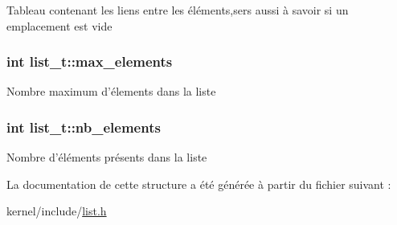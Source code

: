 Tableau contenant les liens entre les éléments,sers aussi à savoir si un emplacement est vide \hypertarget{structlist__t_a646f05091de2a2667b0f3c9aaffdfbdc}{
\subsubsection[{max\-\_\-elements}]{\setlength{\rightskip}{0pt plus 5cm}int list\-\_\-t\-::max\-\_\-elements}}\label{structlist__t_a646f05091de2a2667b0f3c9aaffdfbdc}
Nombre maximum d'élements dans la liste \hypertarget{structlist__t_a21f815dfb80c00df4cc95304bc29161f}{
\subsubsection[{nb\-\_\-elements}]{\setlength{\rightskip}{0pt plus 5cm}int list\-\_\-t\-::nb\-\_\-elements}}\label{structlist__t_a21f815dfb80c00df4cc95304bc29161f}
Nombre d'éléments présents dans la liste 

La documentation de cette structure a été générée à partir du fichier suivant \-:\begin{DoxyCompactItemize}
\item 
kernel/include/\hyperlink{list_8h}{list.\-h}\end{DoxyCompactItemize}
